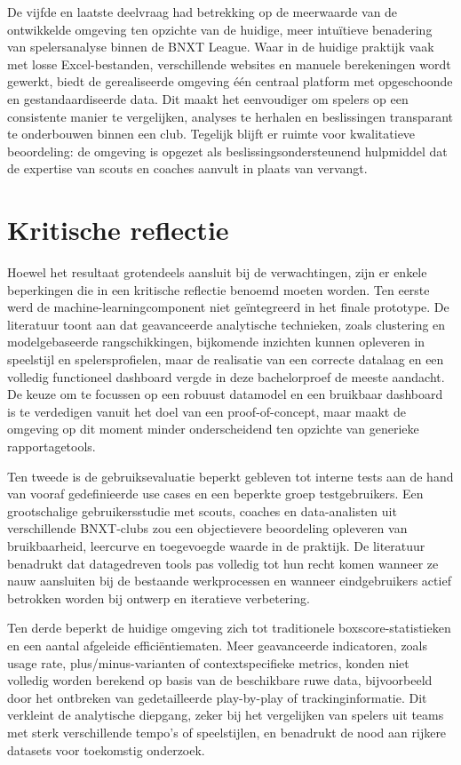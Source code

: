 De vijfde en laatste deelvraag had betrekking op de meerwaarde van de ontwikkelde omgeving ten opzichte van de huidige, meer intuïtieve benadering van spelersanalyse binnen de BNXT League. Waar in de huidige praktijk vaak met losse Excel-bestanden, verschillende websites en manuele berekeningen wordt gewerkt, biedt de gerealiseerde omgeving één centraal platform met opgeschoonde en gestandaardiseerde data. Dit maakt het eenvoudiger om spelers op een consistente manier te vergelijken, analyses te herhalen en beslissingen transparant te onderbouwen binnen een club. Tegelijk blijft er ruimte voor kwalitatieve beoordeling: de omgeving is opgezet als beslissingsondersteunend hulpmiddel dat de expertise van scouts en coaches aanvult in plaats van vervangt.

\section*{Kritische reflectie}

Hoewel het resultaat grotendeels aansluit bij de verwachtingen, zijn er enkele beperkingen die in een kritische reflectie benoemd moeten worden. Ten eerste werd de machine-learningcomponent niet geïntegreerd in het finale prototype. De literatuur toont aan dat geavanceerde analytische technieken, zoals clustering en modelgebaseerde rangschikkingen, bijkomende inzichten kunnen opleveren in speelstijl en spelersprofielen, maar de realisatie van een correcte datalaag en een volledig functioneel dashboard vergde in deze bachelorproef de meeste aandacht. De keuze om te focussen op een robuust datamodel en een bruikbaar dashboard is te verdedigen vanuit het doel van een proof-of-concept, maar maakt de omgeving op dit moment minder onderscheidend ten opzichte van generieke rapportagetools.

Ten tweede is de gebruiksevaluatie beperkt gebleven tot interne tests aan de hand van vooraf gedefinieerde use cases en een beperkte groep testgebruikers. Een grootschalige gebruikersstudie met scouts, coaches en data-analisten uit verschillende BNXT-clubs zou een objectievere beoordeling opleveren van bruikbaarheid, leercurve en toegevoegde waarde in de praktijk. De literatuur benadrukt dat datagedreven tools pas volledig tot hun recht komen wanneer ze nauw aansluiten bij de bestaande werkprocessen en wanneer eindgebruikers actief betrokken worden bij ontwerp en iteratieve verbetering.

Ten derde beperkt de huidige omgeving zich tot traditionele boxscore-statistieken en een aantal afgeleide efficiëntiematen. Meer geavanceerde indicatoren, zoals usage rate, plus/minus-varianten of contextspecifieke metrics, konden niet volledig worden berekend op basis van de beschikbare ruwe data, bijvoorbeeld door het ontbreken van gedetailleerde play-by-play of trackinginformatie. Dit verkleint de analytische diepgang, zeker bij het vergelijken van spelers uit teams met sterk verschillende tempo's of speelstijlen, en benadrukt de nood aan rijkere datasets voor toekomstig onderzoek.

